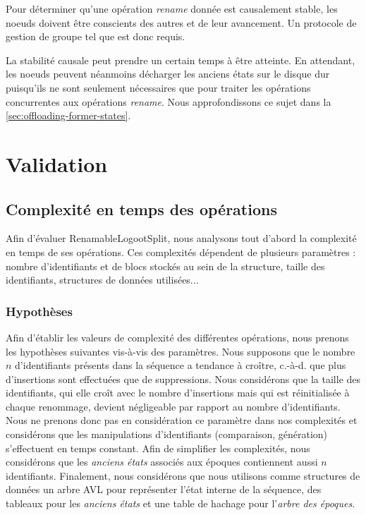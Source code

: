 \documentclass[12pt]{thesul}
\newcommand{\ie}{c.-à-d. }
\begin{document}
Pour déterminer qu'une opération \emph{rename} donnée est causalement stable, les noeuds doivent être conscients des autres et de leur avancement.
Un protocole de gestion de groupe tel que \cite{swim2002,lifeguard2018} est donc requis.

La stabilité causale peut prendre un certain temps à être atteinte.
En attendant, les noeuds peuvent néanmoins décharger les anciens états sur le disque dur puisqu'ils ne sont seulement nécessaires que pour traiter les opérations concurrentes aux opérations \emph{rename}.
Nous approfondissons ce sujet dans la \autoref{sec:offloading-former-states}.

\section{Validation}


\subsection{Complexité en temps des opérations}

Afin d'évaluer RenamableLogootSplit, nous analysons tout d'abord la complexité en temps de ses opérations.
Ces complexités dépendent de plusieurs paramètres : nombre d'identifiants et de blocs stockés au sein de la structure, taille des identifiants, structures de données utilisées...

\subsubsection{Hypothèses}

Afin d'établir les valeurs de complexité des différentes opérations, nous prenons les hypothèses suivantes vis-à-vis des paramètres.
Nous supposons que le nombre $n$ d'identifiants présents dans la séquence a tendance à croître, \ie que plus d'insertions sont effectuées que de suppressions.
Nous considérons que la taille des identifiants, qui elle croît avec le nombre d'insertions mais qui est réinitialisée à chaque renommage, devient négligeable par rapport au nombre d'identifiants.
Nous ne prenons donc pas en considération ce paramètre dans nos complexités et considérons que les manipulations d'identifiants (comparaison, génération) s'effectuent en temps constant.
Afin de simplifier les complexités, nous considérons que les \emph{anciens états} associés aux époques contiennent aussi $n$ identifiants.
Finalement, nous considérons que nous utilisons comme structures de données un arbre AVL pour représenter l'état interne de la séquence, des tableaux pour les \emph{anciens états} et une table de hachage pour l'\emph{arbre des époques}.
\end{document}
